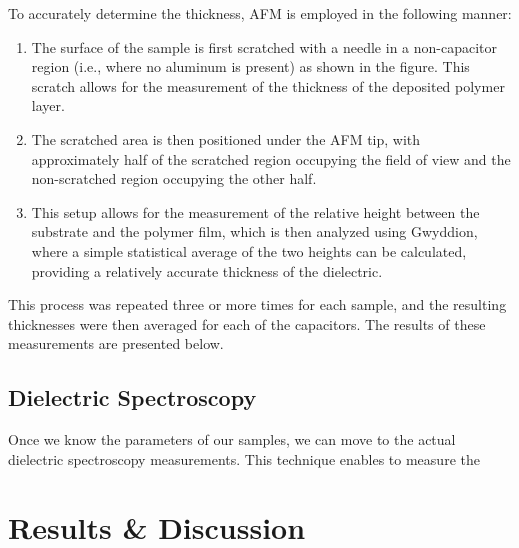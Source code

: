 To accurately determine the thickness, AFM is employed in the following manner:
\begin{enumerate}
    \item The surface of the sample is first scratched with a needle in a non-capacitor region (i.e., where no aluminum is present) as shown in the figure. This scratch allows for the measurement of the thickness of the deposited polymer layer. %
    \item The scratched area is then positioned under the AFM tip, with approximately half of the scratched region occupying the field of view and the non-scratched region occupying the other half.
    \item This setup allows for the measurement of the relative height between the substrate and the polymer film, which is then analyzed using Gwyddion, %
where a simple statistical average of the two heights can be calculated, providing a relatively accurate thickness of the dielectric.
\end{enumerate}

This process was repeated three or more times for each sample, and the resulting thicknesses were then averaged for each of the capacitors. The results of these measurements are presented below.

\section{Dielectric Spectroscopy}
Once we know the parameters of our samples, we can move to the actual dielectric spectroscopy measurements.
This technique enables to measure the

\chapter{Results \& Discussion}
